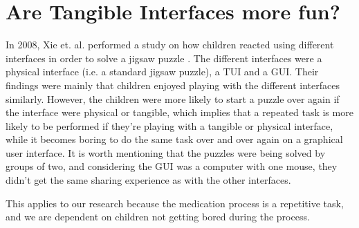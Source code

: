 \section{Are Tangible Interfaces more fun?}
In 2008, Xie et. al. performed a study on how children reacted using different interfaces in order to solve a jigsaw puzzle \cite{xie2008tangibles}. The different interfaces were a physical interface (i.e. a standard jigsaw puzzle), a TUI and a GUI. Their findings were mainly that children enjoyed playing with the different interfaces similarly. However, the children were more likely to start a puzzle over again if the interface were physical or tangible, which implies that a repeated task is more likely to be performed if they're playing with a tangible or physical interface, while it becomes boring to do the same task over and over again on a graphical user interface. It is worth mentioning that the puzzles were being solved by groups of two, and considering the GUI was a computer with one mouse, they didn't get the same sharing experience as with the other interfaces. 


This applies to our research because the medication process is a repetitive task, and we are dependent on children not getting bored during the process.     